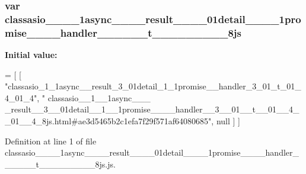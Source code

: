 \subsubsection[{classasio\+\_\+\+\_\+1\+\_\+\+\_\+1async\+\_\+\+\_\+\+\_\+\+\_\+result\+\_\+\+\_\+3\+\_\+\+\_\+01detail\+\_\+\+\_\+1\+\_\+\+\_\+1promise\+\_\+\+\_\+\+\_\+\+\_\+handler\+\_\+\+\_\+3\+\_\+\+\_\+01\+\_\+\+\_\+t\+\_\+\+\_\+01\+\_\+\+\_\+4\+\_\+\+\_\+01\+\_\+\+\_\+4\+\_\+8js}]{\setlength{\rightskip}{0pt plus 5cm}var classasio\+\_\+\+\_\+\_\+\+\_\+1async\+\_\+\+\_\+\+\_\+\+\_\+result\+\_\+\+\_\+\_\+\+\_\+01detail\+\_\+\+\_\+\_\+\+\_\+1promise\+\_\+\+\_\+\+\_\+\+\_\+handler\+\_\+\+\_\+\_\+\+\_\+\_\+\+\_\+t\+\_\+\+\_\+\_\+\+\_\+\_\+\+\_\+\_\+\+\_\+\_\+8js}\label{classasio____1____1async________result____3____01detail____1____1promise________handler____3____4d819f70eb736eab86e5d55d2bdc5d9f_abde1bec2a7e65a69ec1652cee995ff20}
{\bfseries Initial value\+:}
\begin{DoxyCode}
=
[
    [ \textcolor{stringliteral}{"classasio\_1\_1async\_\_result\_3\_01detail\_1\_1promise\_\_handler\_3\_01\_t\_01\_4\_01\_4"}, \textcolor{stringliteral}{"
      classasio\_\_1\_\_1async\_\_\_
      \_result\_\_3\_\_01detail\_\_1\_\_1promise\_\_\_\_handler\_\_3\_\_01\_\_t\_\_01\_\_4\_\_01\_\_4\_8js.html#ae3d5465b2c1efa7f29f571af64080685"}, null ]
]
\end{DoxyCode}


Definition at line 1 of file classasio\+\_\+\+\_\+\_\+\+\_\+1async\+\_\+\+\_\+\+\_\+\+\_\+result\+\_\+\+\_\+\_\+\+\_\+01detail\+\_\+\+\_\+\_\+\+\_\+1promise\+\_\+\+\_\+\+\_\+\+\_\+handler\+\_\+\+\_\+\_\+\+\_\+\_\+\+\_\+t\+\_\+\+\_\+\_\+\+\_\+\_\+\+\_\+\_\+\+\_\+\_\+8js.\+js.

